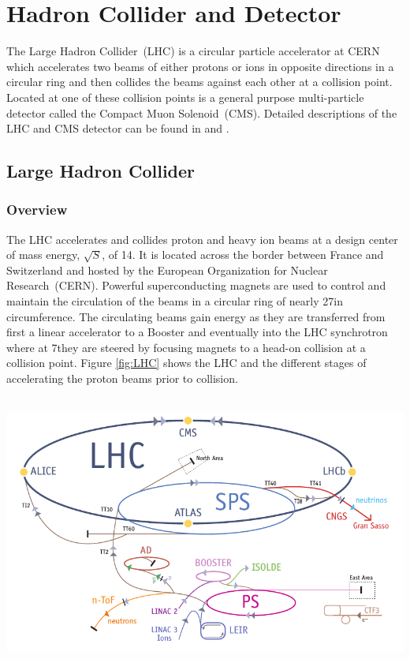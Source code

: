\chapter{Hadron Collider and Detector}
The Large Hadron Collider~(LHC) is a circular particle accelerator at CERN which accelerates two beams of either protons or ions  in opposite directions in a circular ring and then collides the beams against each other at a collision point. Located at one of these collision points is a general purpose multi-particle detector called the Compact Muon Solenoid~(CMS). Detailed descriptions of the LHC and CMS detector can be found in \cite{LHC} and \cite{CMSTDR,CMSTDR1}.
\section{Large Hadron Collider}
\subsection{Overview}
The LHC accelerates and collides proton and heavy ion beams at a design center of mass energy, $\displaystyle{\sqrt{S}}$, of 14\TeV.  It is located across the border between France and Switzerland and hosted by the European Organization for Nuclear Research~(CERN). Powerful superconducting magnets are used to control and maintain the circulation of the beams in a circular ring of nearly 27\km in circumference. The circulating beams gain energy as they are transferred from first a linear accelerator to a Booster and eventually into the LHC synchrotron where at 7\TeV they are steered by focusing magnets to a head-on collision at a collision point. Figure \ref{fig:LHC} shows the LHC and the different stages of accelerating the proton beams  prior to collision.
\begin{center}
\mbox{
\includegraphics[width=6in]{THESISPLOTS/The_LHC.png}}
\label{fig:LHC}
\end{center}
